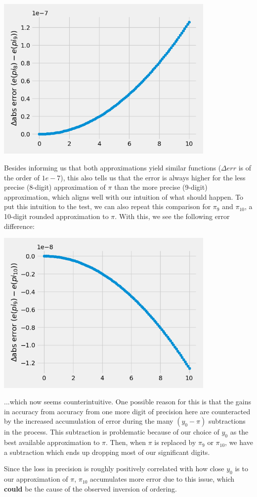 \begin{center}
	\includegraphics*[width=0.8\textwidth]{res/2.1-error-diff.png}
\end{center}

Besides informing us that both approximations yield similar functions ($\Delta err$ is of the order of $1e-7$), this also tells us that the error is always higher for the less precise (8-digit) approximation of $\pi$ than the more precise (9-digit) approximation, which aligns well with our intuition of what should happen. To put this intuition to the test, we can also repeat this comparison for $\pi_9$ and $\pi_{10}$, a 10-digit rounded approximation to $\pi$. With this, we see the following error difference:

\begin{center}
	\includegraphics*[width=0.8\textwidth]{res/2.1-error-diff-10.png}
\end{center}

...which now seems counterintuitive. One possible reason for this is that the gains in accuracy from accuracy from one more digit of precision here are counteracted by the increased accumulation of error during the many $(y_0 - \pi)$ subtractions in the process. This subtraction is problematic because of our choice of $y_0$ as the best available approximation to $\pi$. Then, when $\pi$ is replaced by $\pi_9$ or $\pi_10$, we have a subtraction which ends up dropping most of our significant digits.\bigskip

Since the loss in precision is roughly positively correlated with how close $y_0$ is to our approximation of $\pi$, $\pi_10$ accumulates more error due to this issue, which \textbf{could} be the cause of the observed inversion of ordering.